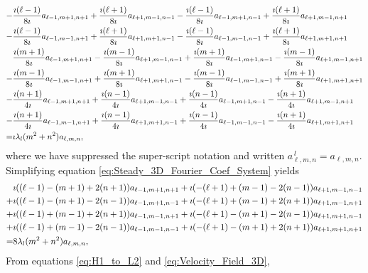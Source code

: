 \documentclass[11pt]{amsart}
\begin{document}
\begin{align}\label{eq:Steady_3D_Fourier_Coef_System}
-&\frac{\imath(\ell-1)}{8\imath}a_{\ell-1,m+1,n+1}+\frac{\imath(\ell+1)}{8\imath}a_{\ell+1,m-1,n-1}
 -\frac{\imath(\ell-1)}{8\imath}a_{\ell-1,m+1,n-1}+\frac{\imath(\ell+1)}{8\imath}a_{\ell+1,m-1,n+1}\notag\\
 -&\frac{\imath(\ell-1)}{8\imath}a_{\ell-1,m-1,n+1}+\frac{\imath(\ell+1)}{8\imath}a_{\ell+1,m+1,n-1}
  -\frac{\imath(\ell-1)}{8\imath}a_{\ell-1,m-1,n-1}+\frac{\imath(\ell+1)}{8\imath}a_{\ell+1,m+1,n+1}
\notag\\
&\frac{\imath(m+1)}{8\imath}a_{\ell-1,m+1,n+1}-\frac{\imath(m-1)}{8\imath}a_{\ell+1,m-1,n-1}
  +\frac{\imath(m+1)}{8\imath}a_{\ell-1,m+1,n-1}-\frac{\imath(m-1)}{8\imath}a_{\ell+1,m-1,n+1}\notag\\
 -&\frac{\imath(m-1)}{8\imath}a_{\ell-1,m-1,n+1}+\frac{\imath(m+1)}{8\imath}a_{\ell+1,m+1,n-1}
  -\frac{\imath(m-1)}{8\imath}a_{\ell-1,m-1,n-1}+\frac{\imath(m+1)}{8\imath}a_{\ell+1,m+1,n+1}
\notag\\
-&\frac{\imath(n+1)}{4\imath}a_{\ell-1,m+1,n+1}+\frac{\imath(n-1)}{4\imath}a_{\ell+1,m-1,n-1}
  +\frac{\imath(n-1)}{4\imath}a_{\ell-1,m+1,n-1}-\frac{\imath(n+1)}{4\imath}a_{\ell+1,m-1,n+1}\notag\\
 -&\frac{\imath(n+1)}{4\imath}a_{\ell-1,m-1,n+1}+\frac{\imath(n-1)}{4\imath}a_{\ell+1,m+1,n-1}
  +\frac{\imath(n-1)}{4\imath}a_{\ell-1,m-1,n-1}-\frac{\imath(n+1)}{4\imath}a_{\ell+1,m+1,n+1}
\notag\\
=&\imath\lambda_l(m^2+n^2)a_{\ell,m,n},
\end{align}
%
where we have suppressed the super-script notation and written
$a^{\,l}_{\ell,m,n}=a_{\ell,m,n}$. Simplifying equation
\eqref{eq:Steady_3D_Fourier_Coef_System} yields
%
\begin{align}\label{eq:Steady_3D_Fourier_Coef_System_Simp}
 &\imath((\ell-1)-(m+1)+2(n+1))a_{\ell-1,m+1,n+1}+\imath(-(\ell+1)+(m-1)-2(n-1))a_{\ell+1,m-1,n-1}\notag\\
+&\imath((\ell-1)-(m+1)-2(n-1))a_{\ell-1,m+1,n-1}+\imath(-(\ell+1)+(m-1)+2(n+1))a_{\ell+1,m-1,n+1}\notag\\
+&\imath((\ell-1)+(m-1)+2(n+1))a_{\ell-1,m-1,n+1}+\imath(-(\ell+1)-(m+1)-2(n-1))a_{\ell+1,m+1,n-1}\notag\\
+&\imath((\ell-1)+(m-1)-2(n-1))a_{\ell-1,m-1,n-1}+\imath(-(\ell+1)-(m+1)+2(n+1))a_{\ell+1,m+1,n+1}\notag\\
=&8\lambda_l(m^2+n^2)a_{\ell,m,n},
\end{align}
%
From equations \eqref{eq:H1_to_L2} and \eqref{eq:Velocity_Field_3D},
\end{document}
